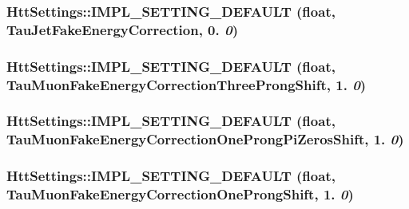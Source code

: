 \label{classHttSettings_a2b5e602f6e39dc6a1f02edc944fd5419}
\hypertarget{classHttSettings_a47895350290a623b6cf46c4766091eeb}{
\subsubsection[{IMPL\_\-SETTING\_\-DEFAULT}]{\setlength{\rightskip}{0pt plus 5cm}HttSettings::IMPL\_\-SETTING\_\-DEFAULT (float, \/  TauJetFakeEnergyCorrection, \/  0. {\em 0})}}
\label{classHttSettings_a47895350290a623b6cf46c4766091eeb}
\hypertarget{classHttSettings_aa5aa20e4627da32fa2de62bd6df5b45e}{
\subsubsection[{IMPL\_\-SETTING\_\-DEFAULT}]{\setlength{\rightskip}{0pt plus 5cm}HttSettings::IMPL\_\-SETTING\_\-DEFAULT (float, \/  TauMuonFakeEnergyCorrectionThreeProngShift, \/  1. {\em 0})}}
\label{classHttSettings_aa5aa20e4627da32fa2de62bd6df5b45e}
\hypertarget{classHttSettings_ad096991b045aed584c1612ee93ae6ea1}{
\subsubsection[{IMPL\_\-SETTING\_\-DEFAULT}]{\setlength{\rightskip}{0pt plus 5cm}HttSettings::IMPL\_\-SETTING\_\-DEFAULT (float, \/  TauMuonFakeEnergyCorrectionOneProngPiZerosShift, \/  1. {\em 0})}}
\label{classHttSettings_ad096991b045aed584c1612ee93ae6ea1}
\hypertarget{classHttSettings_a29def60556d711089d60d145a48b66fa}{
\subsubsection[{IMPL\_\-SETTING\_\-DEFAULT}]{\setlength{\rightskip}{0pt plus 5cm}HttSettings::IMPL\_\-SETTING\_\-DEFAULT (float, \/  TauMuonFakeEnergyCorrectionOneProngShift, \/  1. {\em 0})}}
